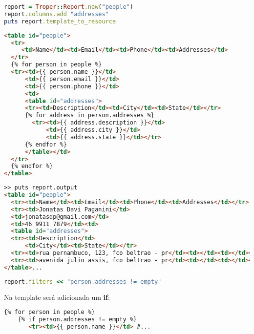 \documentclass{beamer}
\begin{document}
\begin{frame}[fragile]
\begin{lstlisting}[language=ruby, caption=Usando o Troper]
report = Troper::Report.new("people")
report.columns.add "addresses"
puts report.template_to_resource
\end{lstlisting}
\end{frame}

\begin{frame}[fragile]
\begin{lstlisting}[language=html, caption=Resultado do puts anterior]
<table id="people">
  <tr>
     <td>Name</td><td>Email</td><td>Phone</td><td>Addresses</td>
  </tr>
  {% for person in people %}
  <tr><td>{{ person.name }}</td>
      <td>{{ person.email }}</td>
      <td>{{ person.phone }}</td>
      <td>
      <table id="addresses">
      <tr><td>Description</td><td>City</td><td>State</td></tr>
      {% for address in person.addresses %}
        <tr><td>{{ address.description }}</td>
            <td>{{ address.city }}</td>
            <td>{{ address.state }}</td></tr>
      {% endfor %}
      </table></td>
  </tr>
  {% endfor %}
</table>
\end{lstlisting}
\end{frame}

\begin{frame}[fragile]
\begin{lstlisting}[language=html, caption=Executando o relatório]
>> puts report.output
<table id="people">
  <tr><td>Name</td><td>Email</td><td>Phone</td><td>Addresses</td></tr>
  <tr><td>Jonatas Davi Paganini</td>
  <td>jonatasdp@gmail.com</td>
  <td>46 9911 7879</td><td>
  <table id="addresses">
  <tr><td>Description</td>
      <td>City</td><td>State</td></tr>
  <tr><td>rua pernambuco, 123, fco beltrao - pr</td><td></td><td></td></tr>
  <tr><td>avenida julio assis, fco beltrao - pr</td><td></td><td></td></tr>
</table>...
\end{lstlisting}
\end{frame}

\begin{frame}[fragile]
\begin{lstlisting}[language=ruby, caption=Adicionando filtros]
report.filters << "person.addresses != empty"
\end{lstlisting}

Na template será adicionada um \textbf{if}:

\begin{lstlisting}[language=html, caption=Exibindo na template]
  {% for person in people %}
    {% if person.addresses != empty %}
       <tr><td>{{ person.name }}</td> #...
\end{lstlisting}
\end{frame}
\end{document}
